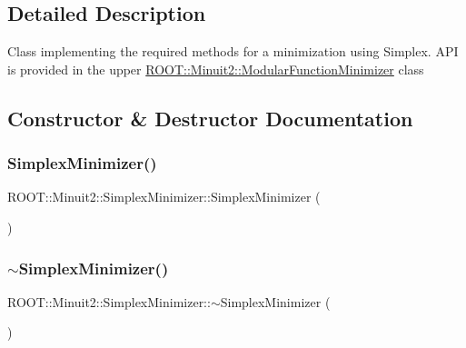 \subsection{Detailed Description}
Class implementing the required methods for a minimization using Simplex. A\+PI is provided in the upper \mbox{\hyperlink{classROOT_1_1Minuit2_1_1ModularFunctionMinimizer}{R\+O\+O\+T\+::\+Minuit2\+::\+Modular\+Function\+Minimizer}} class 

\subsection{Constructor \& Destructor Documentation}
\mbox{\label{classROOT_1_1Minuit2_1_1SimplexMinimizer_a7691b4e4e38176c01ba0f5b5f0acd33f}} 
\subsubsection{\texorpdfstring{SimplexMinimizer()}{SimplexMinimizer()}\hspace{0.1cm}{\footnotesize\ttfamily [1/3]}}
{\footnotesize\ttfamily R\+O\+O\+T\+::\+Minuit2\+::\+Simplex\+Minimizer\+::\+Simplex\+Minimizer (\begin{DoxyParamCaption}{ }\end{DoxyParamCaption})\hspace{0.3cm}{\ttfamily [inline]}}

\mbox{\label{classROOT_1_1Minuit2_1_1SimplexMinimizer_a52f955e2ed5e48a5816300d1c82c4841}} 
\subsubsection{\texorpdfstring{$\sim$SimplexMinimizer()}{~SimplexMinimizer()}\hspace{0.1cm}{\footnotesize\ttfamily [1/3]}}
{\footnotesize\ttfamily R\+O\+O\+T\+::\+Minuit2\+::\+Simplex\+Minimizer\+::$\sim$\+Simplex\+Minimizer (\begin{DoxyParamCaption}{ }\end{DoxyParamCaption})\hspace{0.3cm}{\ttfamily [inline]}}

